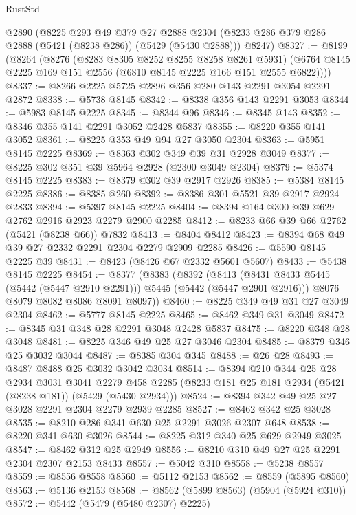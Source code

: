 \begin{lexlean}{RustStd}
\begin{coremodule}
{\begin{coremodule}
{{{{{{{{{{{{    @2890
    (@8225
      @293
      @49
      @379
      @27
      @2888
      @2304
      (@8233 @286 @379 @286 @2888 (@5421 (@8238 @286)) (@5429 (@5430 @2888)))
      @8247)
@8327 := @8199
    (@8264
      (@8276
        (@8283 @8305 @8252 @8255 @8258 @8261 @5931)
        (@6764 @8145 @2225 @169 @151 @2556 (@6810 @8145 @2225 @166 @151 @2555 @6822))))
@8337 := @8266 @2225 @5725 @2896 @356 @280 @143 @2291 @3054 @2291 @2872
@8338 := @5738 @8145
@8342 := @8338 @356 @143 @2291 @3053
@8344 := @5983 @8145 @2225
@8345 := @8344 @96
@8346 := @8345 @143
@8352 := @8346 @355 @141 @2291 @3052 @2428 @5837
@8355 := @8220 @355 @141 @3052
@8361 := @8225 @353 @49 @94 @27 @3050 @2304
@8363 := @5951 @8145 @2225
@8369 := @8363 @302 @349 @39 @31 @2928 @3049
@8377 := @8225 @302 @351 @39 @5964 @2928 (@2300 @3049 @2304)
@8379 := @5374 @8145 @2225
@8383 := @8379 @302 @39 @2917 @2926
@8385 := @5384 @8145 @2225
@8386 := @8385 @260
@8392 := @8386 @301 @5521 @39 @2917 @2924 @2833
@8394 := @5397 @8145 @2225
@8404 := @8394 @164 @300 @39 @629 @2762 @2916 @2923 @2279 @2900 @2285
@8412 := @8233 @66 @39 @66 @2762 (@5421 (@8238 @66)) @7832
@8413 := @8404 @8412
@8423 := @8394 @68 @49 @39 @27 @2332 @2291 @2304 @2279 @2909 @2285
@8426 := @5590 @8145 @2225 @39
@8431 := @8423 (@8426 @67 @2332 @5601 @5607)
@8433 := @5438 @8145 @2225
@8454 := @8377
    (@8383
      (@8392
        (@8413 (@8431 @8433 @5445 (@5442 (@5447 @2910 @2291))) @5445 (@5442 (@5447 @2901 @2916)))
        @8076
        @8079
        @8082
        @8086
        @8091
        @8097))
@8460 := @8225 @349 @49 @31 @27 @3049 @2304
@8462 := @5777 @8145 @2225
@8465 := @8462 @349 @31 @3049
@8472 := @8345 @31 @348 @28 @2291 @3048 @2428 @5837
@8475 := @8220 @348 @28 @3048
@8481 := @8225 @346 @49 @25 @27 @3046 @2304
@8485 := @8379 @346 @25 @3032 @3044
@8487 := @8385 @304 @345
@8488 := @26 @28
@8493 := @8487 @8488 @25 @3032 @3042 @3034
@8514 := @8394
    @210
    @344
    @25
    @28
    @2934
    @3031
    @3041
    @2279
    @458
    @2285
    (@8233 @181 @25 @181 @2934 (@5421 (@8238 @181)) (@5429 (@5430 @2934)))
@8524 := @8394 @342 @49 @25 @27 @3028 @2291 @2304 @2279 @2939 @2285
@8527 := @8462 @342 @25 @3028
@8535 := @8210 @286 @341 @630 @25 @2291 @3026 @2307 @648
@8538 := @8220 @341 @630 @3026
@8544 := @8225 @312 @340 @25 @629 @2949 @3025
@8547 := @8462 @312 @25 @2949
@8556 := @8210 @310 @49 @27 @25 @2291 @2304 @2307 @2153 @8433
@8557 := @5042 @310
@8558 := @5238 @8557
@8559 := @8556 @8558
@8560 := @5112 @2153
@8562 := @8559 (@5895 @8560)
@8563 := @5136 @2153
@8568 := @8562 (@5899 @8563) (@5904 (@5924 @310))
@8572 := @5442 (@5479 (@5480 @2307) @2225)
}}}}}}}}}}}}
\end{coremodule}}
\end{coremodule}
\end{lexlean}
